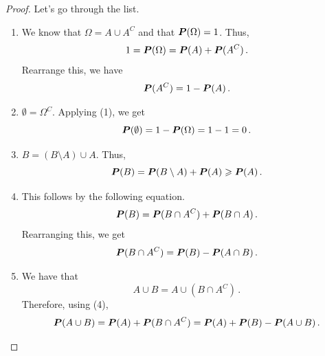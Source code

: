 \begin{proof}
    Let's go through the list.
    \begin{enumerate}
        \item We know that $\Omega = A \cup A^C$ and that $\P(\Omega) = 1$.
            Thus,
            \begin{equation*}
                1 = \P(\Omega) = \P(A) + \P(A^C)\,.
            \end{equation*}
           Rearrange this, we have
           \begin{equation*}
              \P(A^C) = 1 - \P(A) \,. 
           \end{equation*}

       \item $\emptyset = \Omega^C$. Applying (1), we get
           \begin{equation*}
               \P(\emptyset) = 1 - \P(\Omega) = 1-1 = 0 \,.
           \end{equation*}

       \item $B = (B\setminus A) \cup A $. Thus,
           \begin{equation*}
               \P(B) = \P(B \setminus A) + \P(A) \geq \P(A)\,.
           \end{equation*}
           
       \item This follows by the following equation.
           \begin{equation*}
               \P(B) =  \P(B \cap A^C) + \P(B\cap A)\,.
           \end{equation*}
           Rearranging this, we get
           \begin{equation*}
               \P(B\cap A^C) = \P(B) - \P(A\cap B)\,.
           \end{equation*}

       \item We have that 
           \begin{equation*}
               A\cup B = A \cup (B \cap A^C)\,.
           \end{equation*}
           Therefore, using (4),
           \begin{equation*}
            \P(A \cup B) = \P(A) + \P(B \cap A^C) = \P(A) + \P(B) - \P(A \cup B)\,.
           \end{equation*}
    \end{enumerate}
\end{proof}

